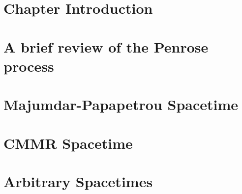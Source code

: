 \section{Chapter Introduction}
\label{ch:penrose_binaries:sec:intro}


\section{A brief review of the Penrose process}
\label{ch:penrose_binaries:sec:penrose_review}


\section{Majumdar-Papapetrou Spacetime}
\label{ch:penrose_binaries:sec:mp_penrose}


\section{CMMR Spacetime}
\label{ch:penrose_binaries:sec:cmmr_penrose}


\section{Arbitrary Spacetimes}
\label{ch:penrose_binaries:sec:arbitrary_penrose}

